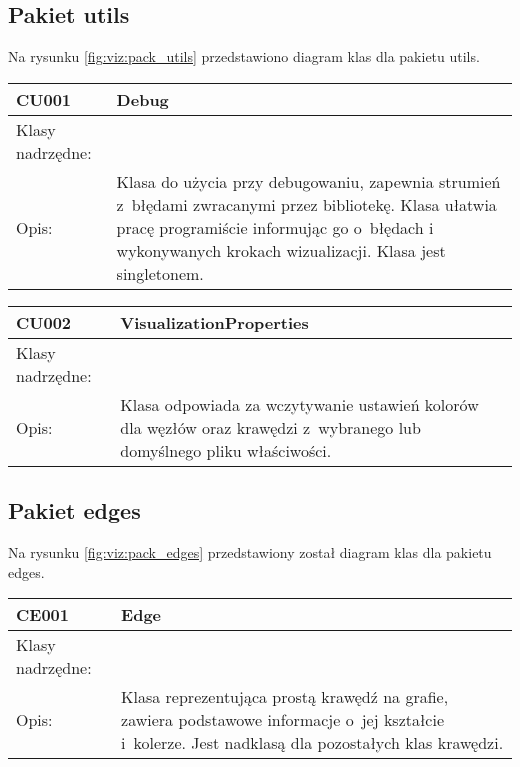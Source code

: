 \subsection*{Pakiet utils}


Na rysunku  \figurename \space \ref{fig:viz:pack_utils}  przedstawiono diagram klas dla pakietu utils.


\begin{center}

\begin{longtable}{|m{3.5cm}|m{8.5cm}|} \hline

CU001 & Debug \\ \hline
Klasy nadrzędne: &     \\ \hline
Opis: & Klasa do użycia przy debugowaniu, zapewnia strumień z~błędami zwracanymi przez bibliotekę. Klasa ułatwia pracę programiście informując go
o~błędach i wykonywanych krokach wizualizacji.  Klasa jest singletonem.\\ \hline


\end{longtable}

\begin{longtable}{|m{3.5cm}|m{8.5cm}|} \hline
 
CU002 & VisualizationProperties \\ \hline
Klasy nadrzędne: &     \\ \hline
Opis: & Klasa odpowiada za wczytywanie ustawień kolorów dla węzłów oraz krawędzi z~wybranego lub domyślnego pliku właściwości. \\ \hline

\end{longtable}
\end{center}

\subsection*{Pakiet edges}

Na rysunku  \figurename \space \ref{fig:viz:pack_edges}  przedstawiony został diagram klas dla pakietu edges.


\begin{longtable}{|m{3.5cm}|m{8.5cm}|} \hline

CE001 & Edge \\ \hline
Klasy nadrzędne: &     \\ \hline
Opis: & Klasa reprezentująca prostą krawędź na grafie, zawiera podstawowe informacje o~jej kształcie i~kolerze. 
Jest nadklasą dla pozostałych klas krawędzi.\\ \hline


\end{longtable}

